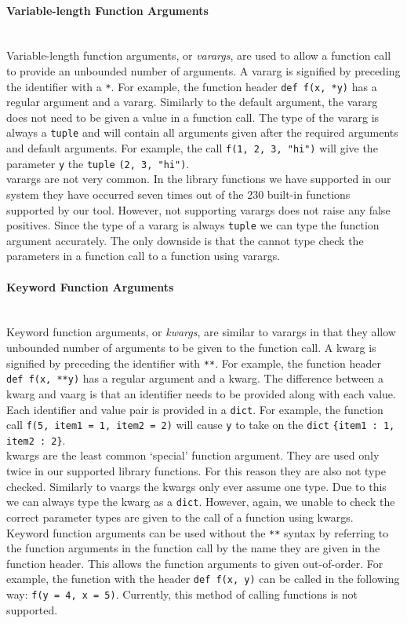 \documentclass[12pt, titlepage]{article}
\begin{document}
\paragraph*{Variable-length Function Arguments}\mbox{} \\
Variable-length function arguments, or \textit{varargs}, are used to allow a function call to provide an unbounded number of arguments. A vararg is signified by preceding the identifier with a \texttt{*}. For example, the function header \texttt{def f(x, *y)} has a regular argument and a vararg. Similarly to the default argument, the vararg does not need to be given a value in a function call. The type of the vararg is always a \texttt{tuple} and will contain all arguments given after the required arguments and default arguments. For example, the call \texttt{f(1, 2, 3, "hi")} will give the parameter \texttt{y} the \texttt{tuple} \texttt{(2, 3, "hi")}. \\
\indent varargs are not very common. In the library functions we have supported in our system they have occurred seven times out of the 230 built-in functions supported by our tool. However, not supporting varargs does not raise any false positives. Since the type of a vararg is always \texttt{tuple} we can type the function argument accurately. The only downside is that the cannot type check the parameters in a function call to a function using varargs. 

\paragraph*{Keyword Function Arguments}\mbox{} \\
Keyword function arguments, or \textit{kwargs}, are similar to varargs in that they allow unbounded number of arguments to be given to the function call. A kwarg is signified by preceding the identifier with \texttt{**}. For example, the function header \texttt{def f(x, **y)} has a regular argument and a kwarg. The difference between a kwarg and vaarg is that an identifier needs to be provided along with each value. Each identifier and value pair is provided in a \texttt{dict}. For example, the function call \texttt{f(5, item1 = 1, item2 = 2)} will cause \texttt{y} to take on the \texttt{dict} \texttt{\{item1 : 1, item2 : 2\}}. \\
\indent kwargs are the least common `special' function argument. They are used only twice in our supported library functions. For this reason they are also not type checked. Similarly to vaargs the kwargs only ever assume one type. Due to this we can always type the kwarg as a \texttt{dict}. However, again, we unable to check the correct parameter types are given to the call of a function using kwargs. \\
\indent Keyword function arguments can be used without the \texttt{**} syntax by referring to the function arguments in the function call by the name they are given in the function header. This allows the function arguments to given out-of-order. For example, the function with the header \texttt{def f(x, y)} can be called in the following way: \texttt{f(y = 4, x = 5)}. Currently, this method of calling functions is not supported.
\end{document}

